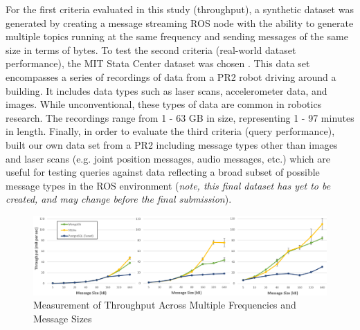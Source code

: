 \documentclass[nocopyrightspace]{acm_proc_article-sp}
\begin{document}
For the first criteria evaluated in this study (throughput), a synthetic dataset was generated by creating a message streaming ROS node with the ability to generate multiple topics running at the same frequency and sending messages of the same size in terms of bytes. To test the second criteria (real-world dataset performance), the MIT Stata Center dataset was chosen \cite{fallon2013stata}. This data set encompasses a series of recordings of data from a PR2 robot driving around a building. It includes data types such as laser scans, accelerometer data, and images. While unconventional, these types of data are common in robotics research. The recordings range from 1 - 63 GB in size, representing 1 - 97 minutes in length. Finally, in order to evaluate the third criteria (query performance), built our own data set from a PR2 including message types other than images and laser scans (e.g. joint position messages, audio messages, etc.) which are useful for testing queries against data reflecting a broad subset of possible message types in the ROS environment (\textit{note, this final dataset has yet to be created, and may change before the final submission}).

\begin{figure}
    \centering
    \includegraphics[width=\linewidth]{images/throughput}
    \caption{Measurement of Throughput Across Multiple Frequencies and Message Sizes}
    \label{fig:throughput}
\end{figure}
\end{document}
